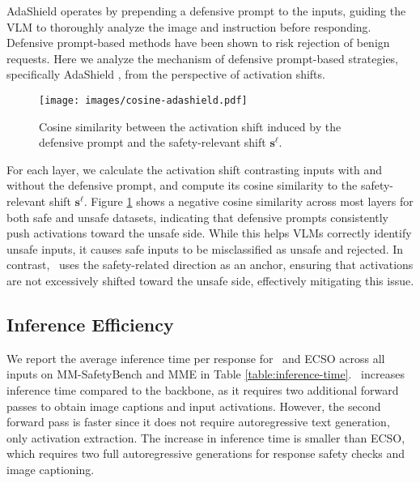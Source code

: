 AdaShield operates by prepending a defensive prompt to the inputs, guiding the VLM to thoroughly analyze the image and instruction before responding. Defensive prompt-based methods have been shown to risk rejection of benign requests. Here we analyze the mechanism of defensive prompt-based strategies, specifically AdaShield \cite{wang2024adashield}, from the perspective of activation shifts. 

\begin{figure}[t]
    \centering
    \texttt{[image: images/cosine-adashield.pdf]}
    \vspace{-15pt}
    \caption{Cosine similarity between the activation shift induced by the defensive prompt and the safety-relevant shift $\mathbf{s}^\ell$.}
    \vspace{-20pt}
    \label{fig:defense-prompt}
\end{figure}

For each layer, we calculate the activation shift contrasting inputs with and without the defensive prompt, and compute its cosine similarity to the safety-relevant shift $\mathbf{s}^\ell$. Figure \ref{fig:defense-prompt} shows a negative cosine similarity across most layers for both safe and unsafe datasets, indicating that defensive prompts consistently push activations toward the unsafe side.  While this helps VLMs correctly identify unsafe inputs, it causes
safe inputs to be misclassified as unsafe and rejected. 
In contrast, \OursMethod\ uses the safety-related direction as an anchor, ensuring that activations are not excessively shifted toward the unsafe side, effectively mitigating this issue.

\subsection{Inference Efficiency}
We report the average inference time per response for \OursMethod\ and ECSO \cite{gou2025eyes} across all inputs on MM-SafetyBench and MME in Table \ref{table:inference-time}. \OursMethod\ increases inference time compared to the backbone, as it requires two additional forward passes to obtain image captions and input activations. However, the second forward pass is faster since it does not require autoregressive text generation, only activation extraction. The increase in inference time is smaller than ECSO, which requires two full autoregressive generations for response safety checks and image captioning.